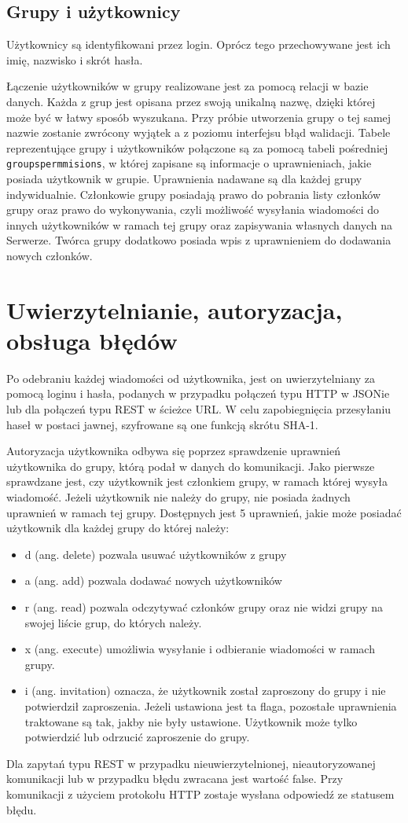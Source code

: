\documentclass[11pt,a4paper,polish,thesis]{dcsbook}
\begin{document}
\subsection{Grupy i użytkownicy}

Użytkownicy są identyfikowani przez login. Oprócz tego przechowywane jest ich imię, nazwisko i skrót hasła.

Łączenie użytkowników w grupy realizowane jest za pomocą relacji w bazie danych. 
Każda z grup jest opisana przez swoją unikalną nazwę, dzięki której może być w łatwy sposób wyszukana. Przy próbie utworzenia grupy o tej samej nazwie zostanie zwrócony wyjątek a z poziomu interfejsu błąd walidacji.
Tabele reprezentujące grupy i użytkowników połączone są za pomocą tabeli pośredniej \texttt{groupspermmisions}, w której zapisane są informacje o uprawnieniach, jakie posiada użytkownik w grupie. 
Uprawnienia nadawane są dla każdej grupy indywidualnie. 
Członkowie grupy posiadają prawo do pobrania listy członków grupy oraz prawo do wykonywania, czyli możliwość wysyłania wiadomości do innych użytkowników w ramach tej grupy oraz zapisywania własnych danych na Serwerze.
Twórca grupy dodatkowo posiada wpis z uprawnieniem do dodawania nowych członków. 

\section{Uwierzytelnianie, autoryzacja, obsługa błędów} 
Po odebraniu każdej wiadomości od użytkownika, jest on uwierzytelniany za pomocą loginu i hasła, podanych w przypadku połączeń typu HTTP w JSONie lub dla połączeń typu REST w ścieżce URL.
W celu zapobiegnięcia przesyłaniu haseł w postaci jawnej, szyfrowane są one funkcją skrótu SHA-1.

Autoryzacja użytkownika odbywa się poprzez sprawdzenie uprawnień użytkownika do grupy, którą podał w danych do komunikacji. 
Jako pierwsze sprawdzane jest, czy użytkownik jest członkiem grupy, w ramach której wysyła wiadomość. 
Jeżeli użytkownik nie należy do grupy, nie posiada żadnych uprawnień w ramach tej grupy.
Dostępnych jest 5 uprawnień, jakie może posiadać użytkownik dla każdej grupy do której należy:
\begin{itemize}
\item d (ang. delete) pozwala usuwać użytkowników z grupy
\item a (ang. add) pozwala dodawać nowych użytkowników
\item r (ang. read) pozwala odczytywać członków grupy oraz nie widzi grupy na swojej liście grup, do których należy.
\item x (ang. execute) umożliwia wysyłanie i odbieranie wiadomości w ramach grupy.
\item i (ang. invitation) oznacza, że użytkownik został zaproszony do grupy i nie potwierdził zaproszenia. Jeżeli ustawiona jest ta flaga, pozostałe uprawnienia traktowane są tak, jakby nie były ustawione. Użytkownik może tylko potwierdzić lub odrzucić zaproszenie do grupy.
\end{itemize}
Dla zapytań typu REST w przypadku nieuwierzytelnionej, nieautoryzowanej komunikacji lub w przypadku błędu zwracana jest wartość false.
Przy komunikacji z użyciem protokołu HTTP zostaje wysłana odpowiedź ze statusem błędu.
\end{document}
